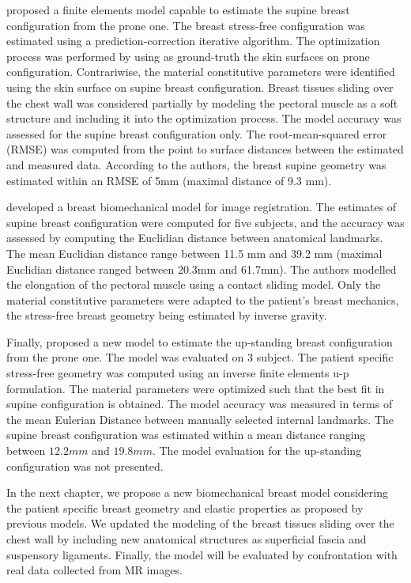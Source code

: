  \cite{gamage_modelling_2012} proposed a finite elements model capable to estimate the supine breast configuration from the prone one. The breast stress-free configuration was estimated using a prediction-correction iterative algorithm. The optimization process was performed by using as ground-truth the skin surfaces on prone configuration. Contrariwise, the material constitutive parameters were identified using the skin surface on supine breast configuration. Breast tissues sliding over the chest wall was considered partially by modeling the pectoral muscle as a soft structure and including it into the optimization process. The model accuracy was assessed for the supine breast configuration only. The root-mean-squared error (RMSE) was computed from the point to surface distances between the estimated and measured data. According to the authors, the breast supine geometry was estimated within an RMSE of 5mm (maximal distance of 9.3 mm). 

\cite{han_nonlinear_2014} developed a breast biomechanical model for image registration. The estimates of supine breast configuration were computed for five subjects, and the accuracy was assessed by computing the Euclidian distance between anatomical landmarks.  The mean Euclidian distance range between 11.5 mm and 39.2 mm (maximal Euclidian distance ranged between 20.3mm and 61.7mm). The authors modelled the elongation of the pectoral muscle using a contact sliding model. Only the material constitutive parameters were adapted to the patient’s breast mechanics, the stress-free breast geometry being estimated by inverse gravity. 

Finally, \cite{eiben_surface_2016} proposed a new model to estimate the up-standing breast configuration from the prone one. The model was evaluated on 3 subject. The patient specific stress-free geometry was computed using an inverse finite elements u-p formulation. The material parameters were optimized such that the best fit in supine configuration is obtained. The model accuracy was measured in terms of the mean Eulerian Distance between manually selected internal landmarks. The supine breast configuration was estimated within a mean distance ranging between $12.2mm$ and $19.8 mm$. The model evaluation for the up-standing configuration was not presented.

In the next chapter, we propose a new biomechanical breast model considering the patient specific breast geometry and elastic properties as proposed by previous models. We updated the modeling of the breast tissues sliding over the chest wall by including new anatomical structures as superficial fascia and suspensory ligaments. Finally, the model will be evaluated by confrontation with real data collected from MR images.        
 
 

